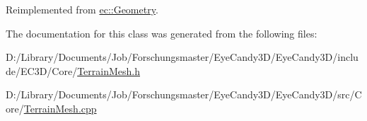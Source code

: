 Reimplemented from \mbox{\hyperlink{classec_1_1_geometry_aec31f79de7f0afb78d4e3eb77b43574e}{ec\+::\+Geometry}}.



The documentation for this class was generated from the following files\+:\begin{DoxyCompactItemize}
\item 
D\+:/\+Library/\+Documents/\+Job/\+Forschungsmaster/\+Eye\+Candy3\+D/\+Eye\+Candy3\+D/include/\+E\+C3\+D/\+Core/\mbox{\hyperlink{_terrain_mesh_8h}{Terrain\+Mesh.\+h}}\item 
D\+:/\+Library/\+Documents/\+Job/\+Forschungsmaster/\+Eye\+Candy3\+D/\+Eye\+Candy3\+D/src/\+Core/\mbox{\hyperlink{_terrain_mesh_8cpp}{Terrain\+Mesh.\+cpp}}\end{DoxyCompactItemize}
